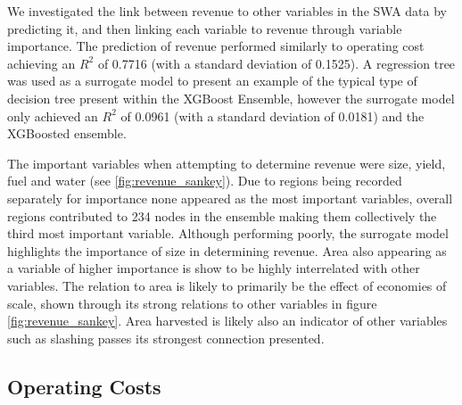 \documentclass[review,12pt,authoryear]{elsarticle}
\begin{document}
\begin{linenumbers}
We investigated the link between revenue to other variables in the SWA data by predicting it, and then linking each variable to revenue through variable importance. The prediction of revenue performed similarly to operating cost achieving an $R^2$ of 0.7716 (with a standard deviation of 0.1525). A regression tree was used as a surrogate model to present an example of the typical type of decision tree present within the XGBoost Ensemble, however the surrogate model only achieved an $R^2$ of 0.0961 (with a standard deviation of 0.0181) and the XGBoosted ensemble.
\par
The important variables when attempting to determine revenue were size, yield, fuel and water (see \ref{fig:revenue_sankey}). Due to regions being recorded separately for importance none appeared as the most important variables, overall regions contributed to 234 nodes in the ensemble making them collectively the third most important variable. Although performing poorly, the surrogate model highlights the importance of size in determining revenue. Area also appearing as a variable of higher importance is show to be highly interrelated with other variables. The relation to area is likely to primarily be the effect of economies of scale, shown through its strong relations to other variables in figure \ref{fig:revenue_sankey}. Area harvested is likely also an indicator of other variables such as slashing passes its strongest connection presented.

\subsection{Operating Costs}


\end{linenumbers}
\end{document}
